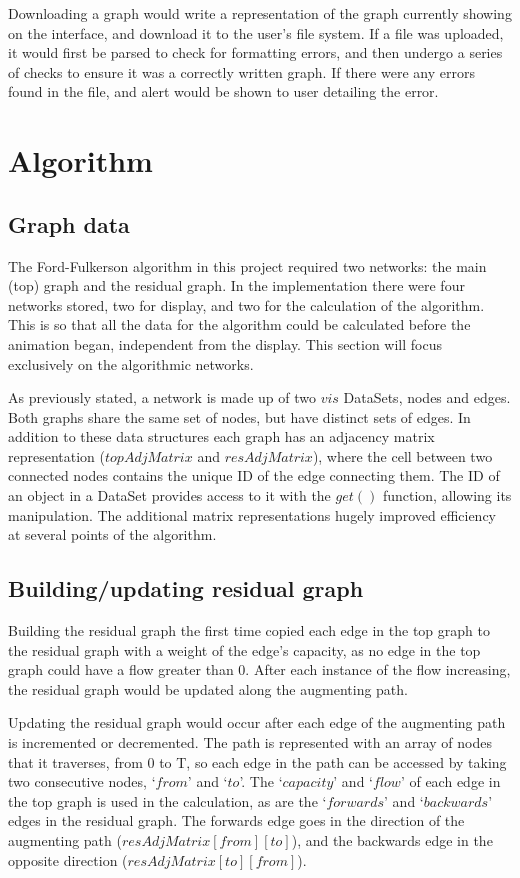 \documentclass{l4proj}
\begin{document}
Downloading a graph would write a representation of the graph currently showing on the interface, and download it to the user's file system. If a file was uploaded, it would first be parsed to check for formatting errors, and then undergo a series of checks to ensure it was a correctly written graph. If there were any errors found in the file, and alert would be shown to user detailing the error.

\section{Algorithm}
\subsection{Graph data}
The Ford-Fulkerson algorithm in this project required two networks: the main (top) graph and the residual graph. In the implementation there were four networks stored, two for display, and two for the calculation of the algorithm. This is so that all the data for the algorithm could be calculated before the animation began, independent from the display. This section will focus exclusively on the algorithmic networks.

As previously stated, a network is made up of two $vis$ DataSets, nodes and edges. Both graphs share the same set of nodes, but have distinct sets of edges. In addition to these data structures each graph has an adjacency matrix representation ($topAdjMatrix$ and $resAdjMatrix$), where the cell between two connected nodes contains the unique ID of the edge connecting them. The ID of an object in a DataSet provides access to it with the $get()$ function, allowing its manipulation. The additional matrix representations hugely improved efficiency at several points of the algorithm.

\subsection{Building/updating residual graph}

Building the residual graph the first time copied each edge in the top graph to the residual graph with a weight of the edge's capacity, as no edge in the top graph could have a flow greater than 0. After each instance of the flow increasing, the residual graph would be updated along the augmenting path.

Updating the residual graph would occur after each edge of the augmenting path is incremented or decremented. The path is represented with an array of nodes that it traverses, from 0 to T, so each edge in the path can be accessed by taking two consecutive nodes, `$from$' and `$to$'. The `$capacity$' and `$flow$' of each edge in the top graph is used in the calculation, as are the `$forwards$' and `$backwards$' edges in the residual graph. The forwards edge goes in the direction of the augmenting path ($resAdjMatrix[from][to]$), and the backwards edge in the opposite direction ($resAdjMatrix[to][from]$).
\end{document}
